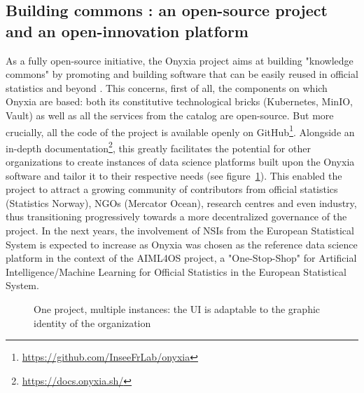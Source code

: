 \documentclass[graybox]{svmult}
\begin{document}
\subsection{Building commons : an open-source project and an open-innovation platform}

As a fully open-source initiative, the Onyxia project aims at building "knowledge commons" by promoting and building software that can be easily reused in official statistics and beyond \cite{schweik2006free}. This concerns, first of all, the components on which Onyxia are based: both its constitutive technological bricks (Kubernetes, MinIO, Vault) as well as all the services from the catalog are open-source. But more crucially, all the code of the project is available openly on GitHub\footnote{\url{https://github.com/InseeFrLab/onyxia}}. Alongside an in-depth documentation\footnote{\url{https://docs.onyxia.sh/}}, this greatly facilitates the potential for other organizations to create instances of data science platforms built upon the Onyxia software and tailor it to their respective needs (see figure~\ref{fig:onyxia-instances}). This enabled the project to attract a growing community of contributors from official statistics (Statistics Norway), NGOs (Mercator Ocean), research centres and even industry, thus transitioning progressively towards a more decentralized governance of the project. In the next years, the involvement of NSIs from the European Statistical System is expected to increase as Onyxia was chosen as the reference data science platform in the context of the AIML4OS project, a "One-Stop-Shop" for Artificial Intelligence/Machine Learning for Official Statistics in the European Statistical System.

\begin{figure}[htbp]
    \centering
    \caption{One project, multiple instances: the UI is adaptable to the graphic identity of the organization}
    \label{fig:onyxia-instances}
\end{figure}
\end{document}
